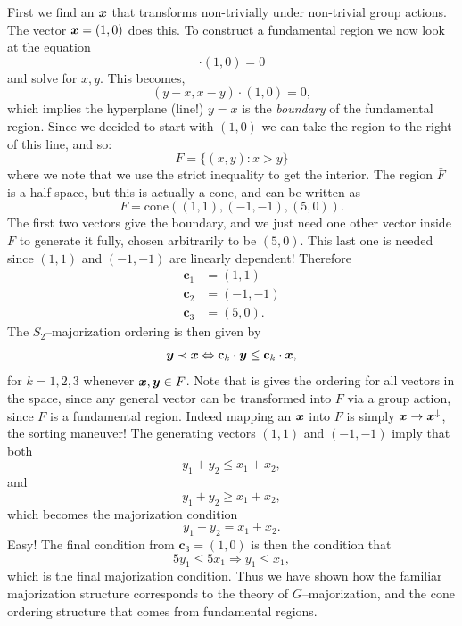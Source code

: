 \documentclass[pra,
aps,
twocolumn,
superscriptaddress,
groupedaddress,
nofootinbib,
reprint
]{revtex4-1}
\begin{document}
First we find an $\boldsymbol{x}$ that transforms non-trivially under non-trivial group actions. The vector $\boldsymbol{x}=(1,0)$ does this. To construct a fundamental region we now look at the equation 
\begin{equation}
[g.(x,y) - (x,y)] \cdot (1,0) = 0
\end{equation}
and solve for $x,y$. This becomes,
\begin{equation}
(y-x, x-y)\cdot(1,0)=0,
\end{equation}
which implies the hyperplane (line!) $y=x$ is the \emph{boundary} of the fundamental region. Since we decided to start with $(1,0)$ we can take the region to the right of this line, and so:
\begin{equation}
F = \{(x,y) : x>y \}
\end{equation}
where we note that we use the strict inequality to get the interior. The region $\bar{F}$ is a half-space, but this is actually a cone, and can be written as
\begin{equation}
F= \mbox{cone}( (1,1),(-1,-1), (5,0)).
\end{equation}
The first two vectors give the boundary, and we just need one other vector inside $F$ to generate it fully, chosen arbitrarily to be $(5,0)$. This last one is needed since $(1,1)$ and $(-1,-1)$ are linearly dependent! Therefore
\begin{align}
\mathbf{c}_1 &= (1,1) \nonumber \\
\mathbf{c}_2 &= (-1,-1) \nonumber \\
\mathbf{c}_3 &= (5,0).
\end{align}
The $S_2$--majorization ordering is then given by
\begin{equation}
\boldsymbol{y} \prec \boldsymbol{x} \Leftrightarrow \mathbf{c}_k \cdot \boldsymbol{y} \le  \mathbf{c}_k \cdot \boldsymbol{x},
\end{equation}
for $k=1,2,3$ whenever $\boldsymbol{x},\boldsymbol{y} \in F$. Note that is gives the ordering for all vectors in the space, since any general vector can be transformed into $F$ via a group action, since $F$ is a fundamental region. Indeed mapping an $\boldsymbol{x}$ into $F$ is simply $\boldsymbol{x} \rightarrow \boldsymbol{x}^\downarrow$, the sorting maneuver!
The generating vectors $(1,1)$ and $(-1,-1)$ imply that both 
\begin{equation}
y_1 + y_2 \le x_1 +x_2,
\end{equation}
and
\begin{equation}
y_1 + y_2 \ge x_1 +x_2,
\end{equation}
which becomes the majorization condition
\begin{equation}
y_1+y_2 = x_1 + x_2.
\end{equation}
Easy! The final condition from $\mathbf{c}_3=(1,0)$ is then the condition that
\begin{equation}
5y_1 \le 5x_1 \Rightarrow y_1 \le x_1,
\end{equation}
which is the final majorization condition. Thus we have shown how the familiar majorization structure corresponds to the theory of $G$--majorization, and the cone ordering structure that comes from fundamental regions.
\end{document}
